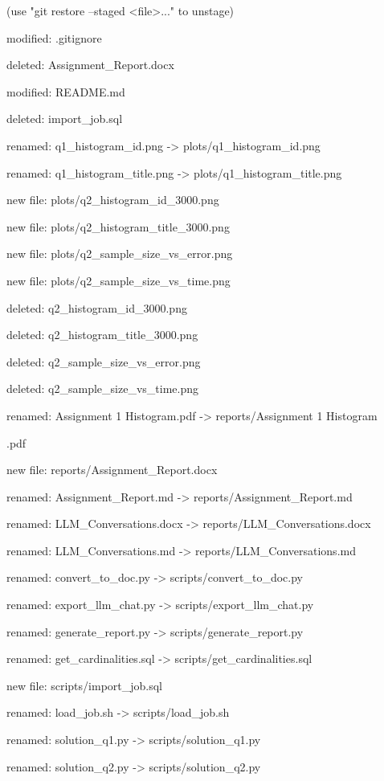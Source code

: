 \documentclass[11pt,a4paper]{article}
\begin{document}
{(use "git restore --staged <file>..." to unstage)

modified:   .gitignore

deleted:    Assignment\_Report.docx

modified:   README.md

deleted:    import\_job.sql

renamed:    q1\_histogram\_id.png -> plots/q1\_histogram\_id.png

renamed:    q1\_histogram\_title.png -> plots/q1\_histogram\_title.png

new file:   plots/q2\_histogram\_id\_3000.png

new file:   plots/q2\_histogram\_title\_3000.png

new file:   plots/q2\_sample\_size\_vs\_error.png

new file:   plots/q2\_sample\_size\_vs\_time.png

deleted:    q2\_histogram\_id\_3000.png

deleted:    q2\_histogram\_title\_3000.png

deleted:    q2\_sample\_size\_vs\_error.png

deleted:    q2\_sample\_size\_vs\_time.png

renamed:    Assignment 1 Histogram.pdf -> reports/Assignment 1 Histogram

.pdf

new file:   reports/Assignment\_Report.docx

renamed:    Assignment\_Report.md -> reports/Assignment\_Report.md

renamed:    LLM\_Conversations.docx -> reports/LLM\_Conversations.docx

renamed:    LLM\_Conversations.md -> reports/LLM\_Conversations.md

renamed:    convert\_to\_doc.py -> scripts/convert\_to\_doc.py

renamed:    export\_llm\_chat.py -> scripts/export\_llm\_chat.py

renamed:    generate\_report.py -> scripts/generate\_report.py

renamed:    get\_cardinalities.sql -> scripts/get\_cardinalities.sql

new file:   scripts/import\_job.sql

renamed:    load\_job.sh -> scripts/load\_job.sh

renamed:    solution\_q1.py -> scripts/solution\_q1.py

renamed:    solution\_q2.py -> scripts/solution\_q2.py


}
\end{document}
